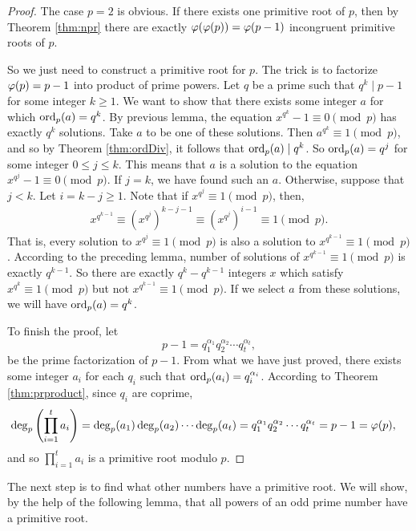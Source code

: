 \documentclass{subfile}
\begin{document}
	\begin{proof}
		The case $p=2$ is obvious. If there exists one primitive root of $p$, then by Theorem \ref{thm:npr} there are exactly $\varphi(\varphi(p))=\varphi(p-1)$ incongruent primitive roots of $p$.
		
		So we just need to construct a primitive root for $p$. The trick is to factorize $\varphi(p)=p-1$ into product of prime powers. Let $q$ be a prime such that $q^k \mid p-1$ for some integer $k \geq 1$. We want to show that there exists some integer $a$ for which $\operatorname{ord}_p(a)=q^k$. By previous lemma, the equation $x^{q^k} - 1 \equiv 0 \pmod p$ has exactly $q^k$ solutions. Take $a$ to be one of these solutions. Then $a^{q^k} \equiv 1 \pmod p$, and so by Theorem \ref{thm:ordDiv}, it follows that $\operatorname{ord}_p(a)\mid q^k$. So $\operatorname{ord}_p(a)=q^j$ for some integer $0 \leq j \leq k$. This means that $a$ is a solution to the equation $x^{q^j} - 1 \equiv 0 \pmod p$. If $j=k$, we have found such an $a$. Otherwise, suppose that $j<k$. Let $i=k-j\geq 1$. Note that if $x^{q^j} \equiv 1 \pmod p$, then,
			\begin{align*}
				x^{q^{k-1}} \equiv \left(x^{q^j}\right)^{k-j-1} \equiv \left(x^{q^j}\right)^{i-1} \equiv 1 \pmod p.
			\end{align*}
		That is, every solution to $x^{q^j} \equiv 1 \pmod p$ is also a solution to $x^{q^{k-1}} \equiv 1 \pmod p$. According to the preceding lemma, number of solutions of $x^{q^{k-1}} \equiv 1 \pmod p$ is exactly $q^{k-1}$. So there are exactly $q^k - q^{k-1}$ integers $x$ which satisfy $x^{q^k} \equiv 1 \pmod p$ but not $x^{q^{k-1}} \equiv 1 \pmod p$. If we select $a$ from these solutions, we will have $\operatorname{ord}_p(a)=q^k$.
		
		To finish the proof, let $$p-1 = q_1^{\alpha_1}q_2^{\alpha_2} \cdots q_t^{\alpha_t},$$ be the prime factorization of $p-1$. From what we have just proved, there exists some integer $a_i$ for each $q_i$ such that $\operatorname{ord}_p(a_i)=q_i^{\alpha_i}$. According to Theorem \eqref{thm:prproduct}, since $q_i$ are coprime, 
			\begin{align*}
				\deg_p\left(\prod_{i=1}^{t}a_i\right)&=\deg_p(a_1) \deg_p(a_2) \cdots \deg_p(a_t)=q_1^{\alpha_1}q_2^{\alpha_2} \cdots q_t^{\alpha_t} = p-1 =\varphi(p),
			\end{align*}
		and so $\prod_{i=1}^{t}a_i$ is a primitive root modulo $p$.
	\end{proof}
	
The next step is to find what other numbers have a primitive root. We will show, by the help of the following lemma, that all powers of an odd prime number have a primitive root.
	
\end{document}
